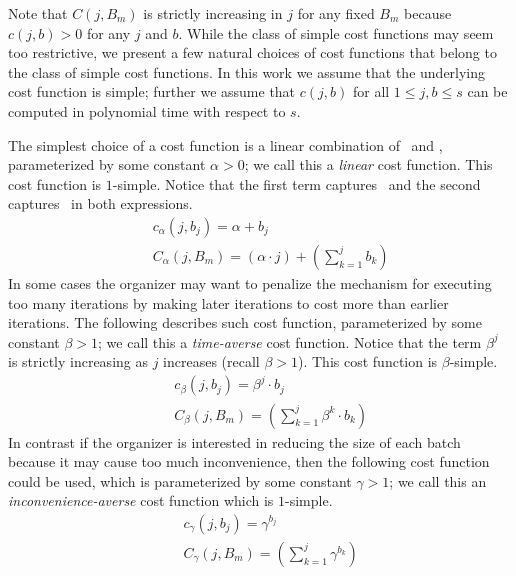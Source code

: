 Note that $C(j, B_{m})$ is strictly increasing in $j$ for any fixed $B_{m}$ because $c(j, b) > 0$ for any $j$ and $b$. While the class of simple cost functions may seem too restrictive, we present a few natural choices of cost functions that belong to the class of simple cost functions. In this work we assume that the underlying cost function is simple; further we assume that $c(j, b)$ for all $1 \leq j, b \leq s$ can be computed in polynomial time with respect to $s$.
\begin{example} \label{bdoodle:exmp:CostFunctions}
	The simplest choice of a cost function is a linear combination of \Time\ and \Inconvenience, parameterized by some constant $\alpha > 0$; we call this a \emph{linear} cost function. This cost function is $1$-simple. Notice that the first term captures \Time\ and the second captures \Inconvenience\ in both expressions.
	\begin{eqnarray*} \label{bdoodle:eqn:linear_cost_function}
	&&	c_{\alpha}(j, b_j) = \alpha + b_j \\
	&&	C_{\alpha}(j, {B}_m) = \left(\alpha \cdot j\right) + \left(\sum_{k=1}^{j} b_k\right)
	\end{eqnarray*}
	In some cases the organizer may want to penalize the mechanism for executing too many iterations by making later iterations to cost more than earlier iterations. The following describes such cost function, parameterized by some constant $\beta > 1$; we call this a \emph{time-averse} cost function. Notice that the term $\beta^j$ is strictly increasing as $j$ increases (recall $\beta > 1$). This cost function is $\beta$-simple.
	\begin{eqnarray*} \label{bdoodle:eqn:time_averse_cost_function}
	&&	c_{\beta}(j, b_j) = \beta^j \cdot b_j \\
	&&	C_{\beta}(j, {B}_m) = \left(\sum_{k=1}^{j} \beta^k \cdot b_k \right)
	\end{eqnarray*}
	In contrast if the organizer is interested in reducing the size of each batch because it may cause too much inconvenience, then the following cost function could be used, which is parameterized by some constant $\gamma > 1$; we call this an \emph{inconvenience-averse} cost function which is $1$-simple.
	\begin{eqnarray*} \label{bdoodle:eqn:inconvenience_averse_cost_function}
	&&	c_{\gamma}(j, b_j) = \gamma^{b_j} \\
	&&	C_{\gamma}(j, {B}_m) = \left(\sum_{k=1}^{j} \gamma^{b_k} \right)
	\end{eqnarray*}
\end{example}


